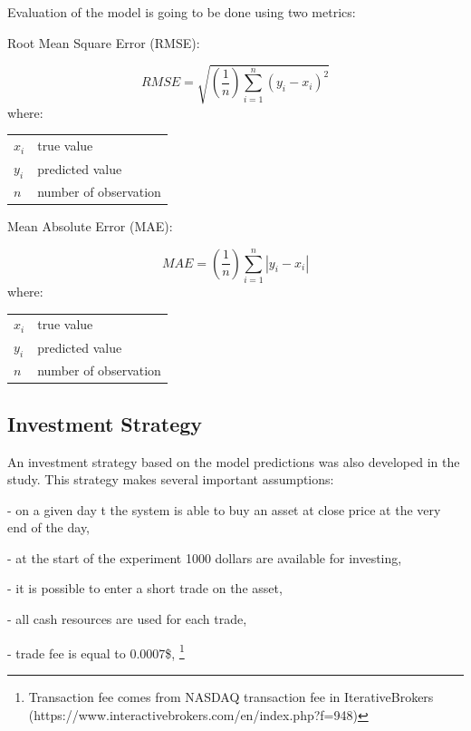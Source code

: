 \documentclass[11pt]{article} %
\makeatletter
\newenvironment{conditions}
  {\par\vspace{\abovedisplayskip}\noindent\begin{tabular}{>{$}l<{$} @{${}={}$} l}}
  {\end{tabular}\par\vspace{\belowdisplayskip}}
\makeatother
\begin{document}
Evaluation of the model is going to be done using two metrics:  \\ 

\begin{center}   Root Mean Square Error (RMSE):  \end{center}
\begin{equation}  RMSE = \sqrt{(\frac{1}{n})\sum_{i=1}^{n}(y_{i} - x_{i})^{2}} \end{equation}
where:
\begin{conditions}
 x_i     &  true value \\
 y_i     &  predicted value \\   
 n &  number of observation
\end{conditions}

\begin{center}  Mean Absolute Error (MAE): \end{center}
\begin{equation} MAE =(\frac{1}{n})\sum_{i=1}^{n}\left | y_{i} - x_{i} \right | \end{equation}
where:
\begin{conditions}
 x_i     &  true value \\
 y_i     &  predicted value \\   
 n &  number of observation
\end{conditions}

\subsection{Investment Strategy}

An investment strategy based on the model predictions was also developed in the study. This strategy makes several important assumptions: 
 \begin{flushleft}- on a given day t the system is able to buy an asset at close price at the very end of the day, \end{flushleft}
 \begin{flushleft}- at the start of the experiment 1000 dollars are available for investing,  \end{flushleft}
 \begin{flushleft}- it is possible to enter a short trade on the asset, \end{flushleft}
\begin{flushleft}- all cash resources are used for each trade, \end{flushleft}
\begin{flushleft}- trade fee is equal to 0.0007\$, \footnote{Transaction fee comes from NASDAQ transaction fee in IterativeBrokers (https://www.interactivebrokers.com/en/index.php?f=948)} \end{flushleft}
\end{document}
